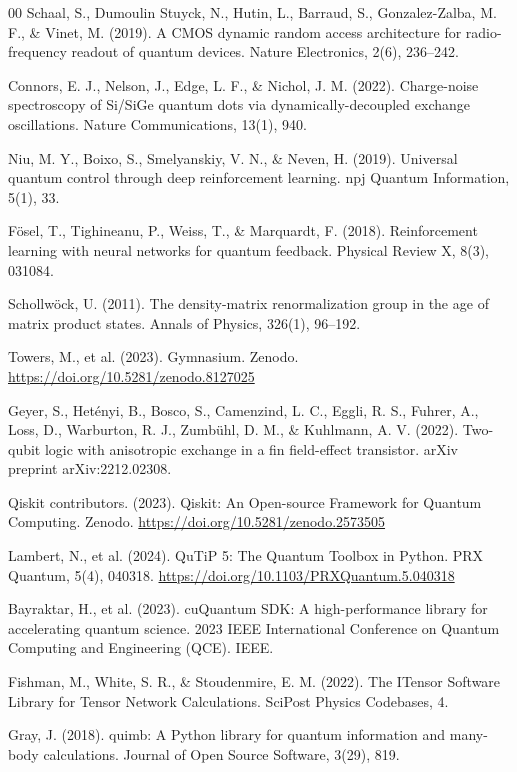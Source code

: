 \documentclass[preprint,12pt, a4paper]{elsarticle}
\begin{document}
\begin{thebibliography}{00}
 Schaal, S., Dumoulin Stuyck, N., Hutin, L., Barraud, S., Gonzalez-Zalba, M. F., \& Vinet, M. (2019). A CMOS dynamic random access architecture for radio-frequency readout of quantum devices. Nature Electronics, 2(6), 236--242.

 Connors, E. J., Nelson, J., Edge, L. F., \& Nichol, J. M. (2022). Charge-noise spectroscopy of Si/SiGe quantum dots via dynamically-decoupled exchange oscillations. Nature Communications, 13(1), 940.

 Niu, M. Y., Boixo, S., Smelyanskiy, V. N., \& Neven, H. (2019). Universal quantum control through deep reinforcement learning. npj Quantum Information, 5(1), 33.

 F\"{o}sel, T., Tighineanu, P., Weiss, T., \& Marquardt, F. (2018). Reinforcement learning with neural networks for quantum feedback. Physical Review X, 8(3), 031084.

 Schollw\"{o}ck, U. (2011). The density-matrix renormalization group in the age of matrix product states. Annals of Physics, 326(1), 96--192.

 Towers, M., et al. (2023). Gymnasium. Zenodo. \url{https://doi.org/10.5281/zenodo.8127025}

 Geyer, S., Het\'{e}nyi, B., Bosco, S., Camenzind, L. C., Eggli, R. S., Fuhrer, A., Loss, D., Warburton, R. J., Zumb\"{u}hl, D. M., \& Kuhlmann, A. V. (2022). Two-qubit logic with anisotropic exchange in a fin field-effect transistor. arXiv preprint arXiv:2212.02308.

 Qiskit contributors. (2023). Qiskit: An Open-source Framework for Quantum Computing. Zenodo. \url{https://doi.org/10.5281/zenodo.2573505}

 Lambert, N., et al. (2024). QuTiP 5: The Quantum Toolbox in Python. PRX Quantum, 5(4), 040318. \url{https://doi.org/10.1103/PRXQuantum.5.040318}

 Bayraktar, H., et al. (2023). cuQuantum SDK: A high-performance library for accelerating quantum science. 2023 IEEE International Conference on Quantum Computing and Engineering (QCE). IEEE.

 Fishman, M., White, S. R., \& Stoudenmire, E. M. (2022). The ITensor Software Library for Tensor Network Calculations. SciPost Physics Codebases, 4.

 Gray, J. (2018). quimb: A Python library for quantum information and many-body calculations. Journal of Open Source Software, 3(29), 819.


\end{thebibliography}
\end{document}
